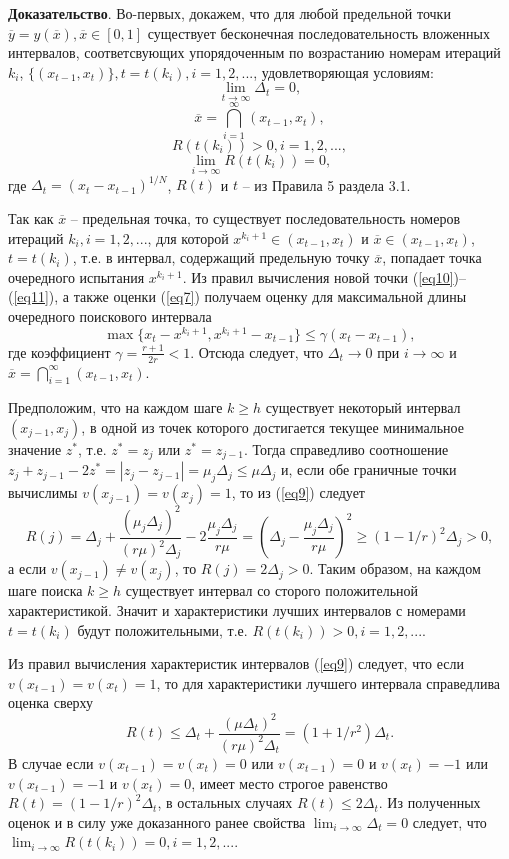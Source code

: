 \documentclass[10pt,a4paper]{book}
\begin{document}
\textbf{Доказательство}. Во-первых, докажем, что для любой предельной точки $\overline{y}=y(\overline{x}), \overline{x} \in [0,1]$ существует бесконечная последовательность вложенных интервалов, соответсвующих упорядоченным по возрастанию номерам итераций $k_i$, $\{(x_{t-1}, x_t)\}, t = t(k_i), i = 1, 2, ...$, удовлетворяющая условиям:
\[
\lim_{t \to \infty}{\Delta_t} = 0,
\]
\[
\overline{x}=\bigcap_{i = 1}^{\infty}{(x_{t-1}, x_t)},
\]
\[
R(t(k_i))>0, i = 1, 2, ... ,
\]
\[
\lim_{i \to \infty}{R(t(k_i))} = 0,
\]
где $\Delta_t = (x_t - x_{t-1})^{1/N}$, $R(t)$ и $t$ -- из Правила 5 раздела 3.1.

Так как $\overline{x}$ -- предельная точка, то существует последовательность номеров итераций ${k_i}, i = 1, 2, ... $, для которой $x^{k_i+1} \in (x_{t-1}, x_{t})$ и $\overline{x} \in (x_{t-1}, x_{t})$, $t = t(k_i)$, т.е. в интервал, содержащий предельную точку $\overline{x}$, попадает точка очередного испытания $x^{k_{i}+1}$. Из правил вычисления новой точки (\ref{eq10})--(\ref{eq11}), а также оценки (\ref{eq7}) получаем
оценку для максимальной длины очередного поискового интервала
\[
\max\{x_t-x^{k_i+1},x^{k_i+1} - x_{t-1}\} \leq \gamma(x_t - x_{t - 1}),
\]
где коэффициент $\gamma = \frac{r+1}{2r} < 1$. Отсюда следует, что $\Delta_t \to 0$ при $i \to \infty$ и $\overline{x}=\bigcap_{i = 1}^{\infty}{(x_{t-1}, x_t)}$.

Предположим, что на каждом шаге $k \geq h$ существует некоторый интервал $(x_{j-1}, x_{j})$, в одной из точек которого достигается текущее минимальное значение $z^*$, т.е. $z^* = z_j$ или $z^* = z_{j-1}$. Тогда справедливо соотношение $z_j + z_{j-1}-2z^* = |z_j-z_{j-1}| = \mu_j \Delta_j \leq \mu \Delta_j$ и, если обе граничные точки вычислимы $v(x_{j-1}) = v(x_j) = 1$, то из (\ref{eq9}) следует
\[
R(j) = \Delta_j + \frac{(\mu_j \Delta_j)^2}{(r\mu)^2 \Delta_j}-2\frac{\mu_j \Delta_j}{r\mu} = (\Delta_j-\frac{\mu_j\Delta_j}{r\mu})^2 \geq (1-1/r)^2 \Delta_j > 0,
\]
а если $v(x_{j-1}) \neq v(x_j)$, то $R(j)=2\Delta_j>0$. Таким образом, на каждом шаге поиска $k \geq h$ существует интервал со сторого положительной характеристикой. Значит и характеристики лучших интервалов с номерами $t = t(k_i)$ будут положительными, т.е. $R(t(k_i))>0, i = 1, 2, ... $.

Из правил вычисления характеристик интервалов (\ref{eq9}) следует, что если $v(x_{t-1}) = v(x_t) = 1$, то для характеристики лучшего интервала справедлива оценка сверху
\[
R(t) \leq \Delta_t + \frac{(\mu \Delta_t)^2}{(r\mu)^2 \Delta_t} = (1+1/r^2) \Delta_t.
\]
В случае если $v(x_{t-1}) = v(x_t) = 0$ или $v(x_{t-1}) = 0$ и $v(x_t) = -1$ или $v(x_{t-1}) = -1$ и $v(x_t) = 0$, имеет место строгое равенство $R(t) = (1-1/r)^2\Delta_t$, в остальных случаях $R(t) \leq 2\Delta_t$. Из полученных оценок и в силу уже доказанного ранее свойства $\lim_{i \to \infty}{\Delta_t} = 0$ следует, что $\lim_{i \to \infty}{R(t(k_i))}=0, i = 1, 2, ...$.
\end{document}
